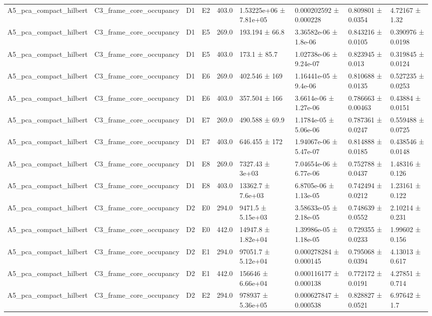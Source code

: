 \begin{table}
\begin{tabular}{lllllllll}
A5\_pca\_compact\_hilbert & C3\_frame\_core\_occupancy & D1 & E2 & 403.0 & 1.53225e+06 ± 7.81e+05 & 0.000202592 ± 0.000228 & 0.809801 ± 0.0354 & 4.72167 ± 1.32 \\
A5\_pca\_compact\_hilbert & C3\_frame\_core\_occupancy & D1 & E5 & 269.0 & 193.194 ± 66.8 & 3.36582e-06 ± 1.8e-06 & 0.843216 ± 0.0105 & 0.390976 ± 0.0198 \\
A5\_pca\_compact\_hilbert & C3\_frame\_core\_occupancy & D1 & E5 & 403.0 & 173.1 ± 85.7 & 1.02738e-06 ± 9.24e-07 & 0.823945 ± 0.013 & 0.319845 ± 0.0124 \\
A5\_pca\_compact\_hilbert & C3\_frame\_core\_occupancy & D1 & E6 & 269.0 & 402.546 ± 169 & 1.16441e-05 ± 9.4e-06 & 0.810688 ± 0.0135 & 0.527235 ± 0.0253 \\
A5\_pca\_compact\_hilbert & C3\_frame\_core\_occupancy & D1 & E6 & 403.0 & 357.504 ± 166 & 3.6614e-06 ± 1.27e-06 & 0.786663 ± 0.00463 & 0.43884 ± 0.0151 \\
A5\_pca\_compact\_hilbert & C3\_frame\_core\_occupancy & D1 & E7 & 269.0 & 490.588 ± 69.9 & 1.1784e-05 ± 5.06e-06 & 0.787361 ± 0.0247 & 0.559488 ± 0.0725 \\
A5\_pca\_compact\_hilbert & C3\_frame\_core\_occupancy & D1 & E7 & 403.0 & 646.455 ± 172 & 1.94067e-06 ± 5.47e-07 & 0.814888 ± 0.0185 & 0.438546 ± 0.0148 \\
A5\_pca\_compact\_hilbert & C3\_frame\_core\_occupancy & D1 & E8 & 269.0 & 7327.43 ± 3e+03 & 7.04654e-06 ± 6.77e-06 & 0.752788 ± 0.0437 & 1.48316 ± 0.126 \\
A5\_pca\_compact\_hilbert & C3\_frame\_core\_occupancy & D1 & E8 & 403.0 & 13362.7 ± 7.6e+03 & 6.8705e-06 ± 1.13e-05 & 0.742494 ± 0.0212 & 1.23161 ± 0.122 \\
A5\_pca\_compact\_hilbert & C3\_frame\_core\_occupancy & D2 & E0 & 294.0 & 9471.5 ± 5.15e+03 & 3.58633e-05 ± 2.18e-05 & 0.748639 ± 0.0552 & 2.10214 ± 0.231 \\
A5\_pca\_compact\_hilbert & C3\_frame\_core\_occupancy & D2 & E0 & 442.0 & 14947.8 ± 1.82e+04 & 1.39986e-05 ± 1.18e-05 & 0.729355 ± 0.0233 & 1.99602 ± 0.156 \\
A5\_pca\_compact\_hilbert & C3\_frame\_core\_occupancy & D2 & E1 & 294.0 & 97051.7 ± 5.12e+04 & 0.000278284 ± 0.000145 & 0.795068 ± 0.0394 & 4.13013 ± 0.617 \\
A5\_pca\_compact\_hilbert & C3\_frame\_core\_occupancy & D2 & E1 & 442.0 & 156646 ± 6.66e+04 & 0.000116177 ± 0.000138 & 0.772172 ± 0.0191 & 4.27851 ± 0.714 \\
A5\_pca\_compact\_hilbert & C3\_frame\_core\_occupancy & D2 & E2 & 294.0 & 978937 ± 5.36e+05 & 0.000627847 ± 0.000538 & 0.828827 ± 0.0521 & 6.97642 ± 1.7 \\

\end{tabular}
\end{table}
